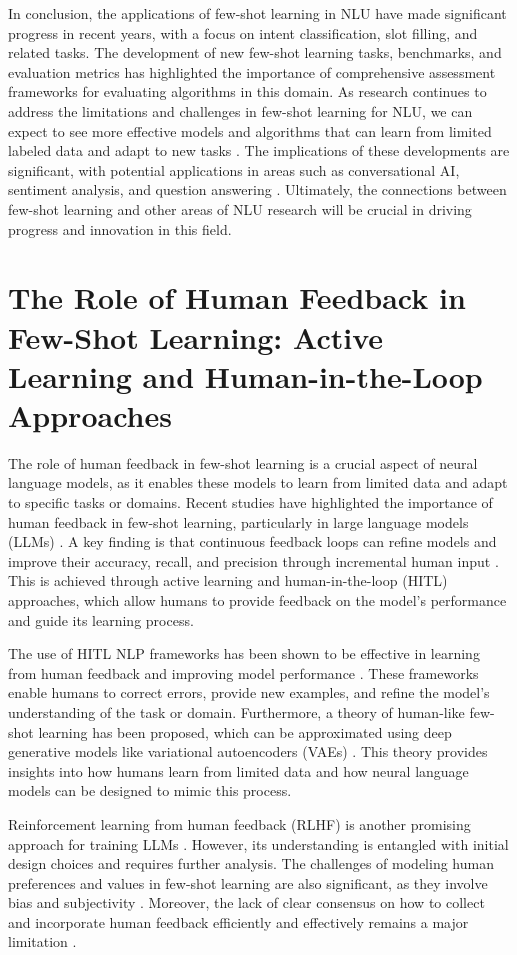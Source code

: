 \documentclass[conference]{IEEEtran}
\begin{document}
In conclusion, the applications of few-shot learning in NLU have made significant progress in recent years, with a focus on intent classification, slot filling, and related tasks. The development of new few-shot learning tasks, benchmarks, and evaluation metrics has highlighted the importance of comprehensive assessment frameworks for evaluating algorithms in this domain. As research continues to address the limitations and challenges in few-shot learning for NLU, we can expect to see more effective models and algorithms that can learn from limited labeled data and adapt to new tasks \cite{b15}. The implications of these developments are significant, with potential applications in areas such as conversational AI, sentiment analysis, and question answering \cite{b16}. Ultimately, the connections between few-shot learning and other areas of NLU research will be crucial in driving progress and innovation in this field.

\section{The Role of Human Feedback in Few-Shot Learning: Active Learning and Human-in-the-Loop Approaches}
The role of human feedback in few-shot learning is a crucial aspect of neural language models, as it enables these models to learn from limited data and adapt to specific tasks or domains. Recent studies have highlighted the importance of human feedback in few-shot learning, particularly in large language models (LLMs) \cite{b1, b2, b3, b4, b5}. A key finding is that continuous feedback loops can refine models and improve their accuracy, recall, and precision through incremental human input \cite{b2}. This is achieved through active learning and human-in-the-loop (HITL) approaches, which allow humans to provide feedback on the model's performance and guide its learning process.

The use of HITL NLP frameworks has been shown to be effective in learning from human feedback and improving model performance \cite{b3}. These frameworks enable humans to correct errors, provide new examples, and refine the model's understanding of the task or domain. Furthermore, a theory of human-like few-shot learning has been proposed, which can be approximated using deep generative models like variational autoencoders (VAEs) \cite{b4}. This theory provides insights into how humans learn from limited data and how neural language models can be designed to mimic this process.

Reinforcement learning from human feedback (RLHF) is another promising approach for training LLMs \cite{b5}. However, its understanding is entangled with initial design choices and requires further analysis. The challenges of modeling human preferences and values in few-shot learning are also significant, as they involve bias and subjectivity \cite{b1, b4}. Moreover, the lack of clear consensus on how to collect and incorporate human feedback efficiently and effectively remains a major limitation \cite{b1}.
\end{document}
